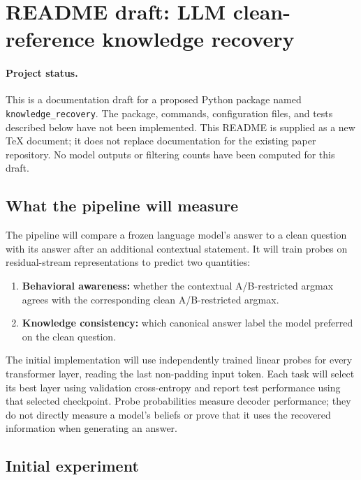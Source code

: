 \documentclass[11pt]{article}
\begin{document}
\section*{README draft: LLM clean-reference knowledge recovery}

\paragraph{Project status.}
This is a documentation draft for a proposed Python package named \texttt{knowledge\_recovery}.
The package, commands, configuration files, and tests described below have not been implemented.
This README is supplied as a new TeX document; it does not replace documentation for the existing paper repository.
No model outputs or filtering counts have been computed for this draft.

\subsection*{What the pipeline will measure}

The pipeline will compare a frozen language model's answer to a clean question with its answer after an additional contextual statement.
It will train probes on residual-stream representations to predict two quantities:
\begin{enumerate}
\item \textbf{Behavioral awareness:} whether the contextual A/B-restricted argmax agrees with the corresponding clean A/B-restricted argmax.
\item \textbf{Knowledge consistency:} which canonical answer label the model preferred on the clean question.
\end{enumerate}
The initial implementation will use independently trained linear probes for every transformer layer, reading the last non-padding input token.
Each task will select its best layer using validation cross-entropy and report test performance using that selected checkpoint.
Probe probabilities measure decoder performance; they do not directly measure a model's beliefs or prove that it uses the recovered information when generating an answer.

\subsection*{Initial experiment}
\end{document}
